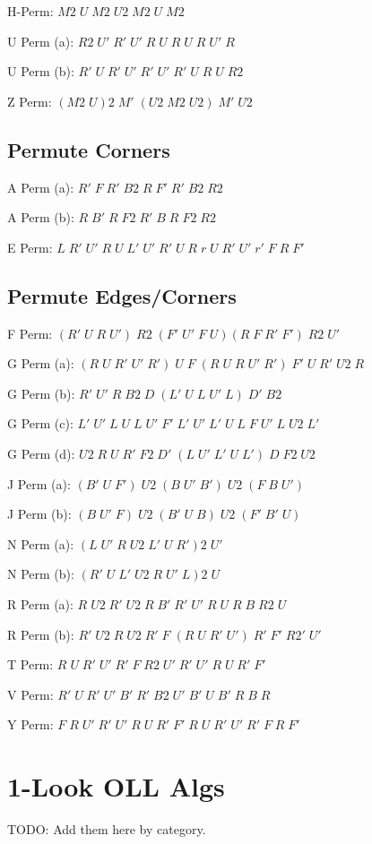 \documentclass[12pt]{article}
\begin{document}
H-Perm: $M2\;U\;M2\;U2\;M2\;U\;M2$

\noindent
U Perm (a): $R2\;U'\;R'\;U'\;R\;U\;R\;U\;R\;U'\;R$

\noindent
U Perm (b): $R'\;U\;R'\;U'\;R'\;U'\;R'\;U\;R\;U\;R2$

\noindent
Z Perm: $(M2\;U)2\;M'\;(U2\;M2\;U2)\;M'\;U2$

\subsection*{Permute Corners}

\noindent
A Perm (a): $R'\;F\;R'\;B2\;R\;F'\;R'\;B2\;R2$

\noindent
A Perm (b): $R\;B'\;R\;F2\;R'\;B\;R\;F2\;R2$

\noindent
E Perm: $L\;R'\;U'\;R\;U\;L'\;U'\;R'\;U\;R\;r\;U\;R'\;U'\;r'\;F\;R\;F'$

\subsection*{Permute Edges/Corners}

\noindent
F Perm: $(R'\;U\;R\;U')\;R2\;(F'\;U'\;F\;U)(R\;F\;R'\;F')\;R2\;U'$

\noindent
G Perm (a): $(R\;U\;R'\;U'\;R')\;U\;F\;(R\;U\;R\;U'\;R')\;F'\;U\;R'\;U2\;R$

\noindent
G Perm (b): $R'\;U'\;R\;B2\;D\;(L'\;U\;L\;U'\;L)\;D'\;B2$

\noindent
G Perm (c): $L'\;U'\;L\;U\;L\;U'\;F'\;L'\;U'\;L'\;U\;L\;F\;U'\;L\;U2\;L'$

\noindent
G Perm (d): $U2\;R\;U\;R'\;F2\;D'\;(L\;U'\;L'\;U\;L')\;D\;F2\;U2$

\noindent
J Perm (a): $(B'\;U\;F')\;U2\;(B\;U'\;B')\;U2\;(F\;B\;U')$

\noindent
J Perm (b): $(B\;U'\;F)\;U2\;(B'\;U\;B)\;U2\;(F'\;B'\;U)$

\noindent
N Perm (a): $(L\;U'\;R\;U2\;L'\;U\;R')2\;U'$

\noindent
N Perm (b): $(R'\;U\;L'\;U2\;R\;U'\;L)2\;U$

\noindent
R Perm (a): $R\;U2\;R'\;U2\;R\;B'\;R'\;U'\;R\;U\;R\;B\;R2\;U$

\noindent
R Perm (b): $R'\;U2\;R\;U2\;R'\;F\;(R\;U\;R'\;U')\;R'\;F'\;R2'\;U'$

\noindent
T Perm: $R\;U\;R'\;U'\;R'\;F\;R2\;U'\;R'\;U'\;R\;U\;R'\;F'$

\noindent
V Perm: $R'\;U\;R'\;U'\;B'\;R'\;B2\;U'\;B'\;U\;B'\;R\;B\;R$

\noindent
Y Perm: $F\;R\;U'\;R'\;U'\;R\;U\;R'\;F'\;R\;U\;R'\;U'\;R'\;F\;R\;F'$

\section*{1-Look OLL Algs}

TODO: Add them here by category.
\end{document}
